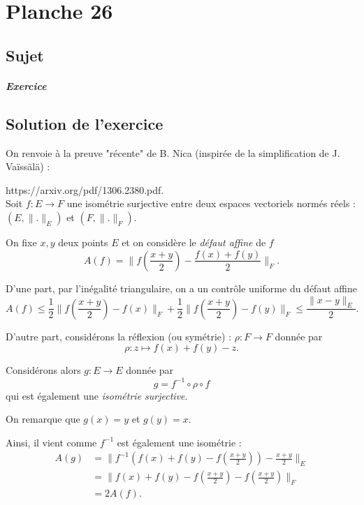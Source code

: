\chapter{Planche 26}

\section{Sujet}

\paragraph{Exercice}

\section{Solution de l'exercice}

On renvoie à la preuve "récente" de B. Nica (inspirée de la simplification de J. Vaïssälä) :

https://arxiv.org/pdf/1306.2380.pdf.\\

Soit $f : E \rightarrow F$ une isométrie surjective entre deux espaces vectoriels normés réels : $(E,\|.\|_{E})$ et $(F,\|.\|_{F}).$

On fixe $x,y$ deux points $E$ et on considère le \emph{défaut affine} de $f$ $$A(f)=\|f(\frac{x+y}{2})-\frac{f(x)+f(y)}{2}\|_{F}.$$

D'une part, par l'inégalité triangulaire, on a un contrôle uniforme du défaut affine $$A(f)\leq \frac{1}{2}\|f(\frac{x+y}{2})-f(x)\|_{F}+\frac{1}{2}\|f(\frac{x+y}{2})-f(y)\|_{F}\leq \frac{\|x-y\|_{E}}{2}.$$

D'autre part, considérons la réflexion (ou symétrie) : $\rho : F \rightarrow F$ donnée par $$\rho : z \mapsto f(x)+f(y)-z.$$

Considérons alors $g : E \rightarrow E$ donnée par $$g=f^{-1}\circ \rho\circ f$$ qui est également une \emph{isométrie surjective}. 

On remarque que $g(x)=y$ et $g(y)=x.$

Ainsi, il vient comme $f^{-1}$ est également une isométrie : 
\begin{align*}
A(g) & = \|f^{-1}\left( f(x)+f(y)-f(\frac{x+y}{2})\right)-\frac{x+y}{2}\|_{E}\\
& = \|f(x)+f(y)-f(\frac{x+y}{2})-f(\frac{x+y}{2})\|_{F}\\
& = 2A(f).
\end{align*}

